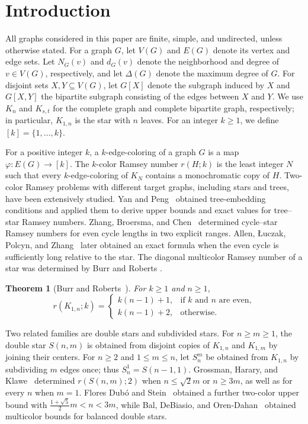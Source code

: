 \documentclass[11pt]{article}
\newtheorem{theorem}{Theorem}[section]
\theoremstyle{definition}
\theoremstyle{remark}
\begin{document}

\section{Introduction}
All graphs considered in this paper are finite, simple, and undirected,
unless otherwise stated. For a graph \(G\), let
\(V(G)\) and \(E(G)\) denote its vertex and edge sets. Let
\(N_G(v)\) and \(d_G(v)\) denote the neighborhood and degree of
\(v\in V(G)\), respectively, and let \(\Delta(G)\) denote the maximum
degree of \(G\). For disjoint sets \(X,Y\subseteq V(G)\), let
\(G[X]\) denote the subgraph induced by \(X\) and \(G[X,Y]\) the
bipartite subgraph consisting of the edges between \(X\) and \(Y\). We use \(K_n\) and \(K_{s,t}\)
for the complete graph and complete bipartite graph, respectively; in
particular, \(K_{1,n}\) is the star with \(n\) leaves. For an integer $k\ge1$, we define $[k]=\{1,\ldots,k\}$.

For a positive integer \(k\), a \(k\)-edge-coloring of a graph \(G\)
is a map \(\varphi:E(G)\to[k]\). The \(k\)-color Ramsey number
\(r(H;k)\) is the least integer \(N\) such that every
\(k\)-edge-coloring of \(K_N\) contains a monochromatic copy of \(H\). Two-color Ramsey problems with different target graphs, including stars and trees, have been extensively studied. Yan and
Peng~\cite{YanPengTreeStar} obtained tree-embedding conditions
and applied them to derive upper bounds and exact values for
tree--star Ramsey numbers. Zhang, Broersma, and
Chen~\cite{ZhangBroersmaChenCycleStar} determined cycle--star
Ramsey numbers for even cycle lengths in two explicit ranges.
Allen, {\L}uczak, Polcyn, and Zhang~\cite{AllenEtAlCycleStar}
later obtained an exact formula when the even cycle is
sufficiently long relative to the star. The diagonal multicolor Ramsey number of a star was determined
by Burr and Roberts \cite{BurrRoberts}.
\begin{theorem}[Burr and Roberts~\cite{BurrRoberts}]
\label{thm:star-ramsey}
For \(k\ge1\) and \(n\ge1\),
\[
 r(K_{1,n};k)=
 \begin{cases}
 k(n-1)+1,&\text{if \(k\) and \(n\) are even},\\
 k(n-1)+2,&\text{otherwise}.
 \end{cases}
\]
\end{theorem}

Two related families are double stars and subdivided stars. For
\(n\ge m\ge1\), the double star \(S(n,m)\) is obtained from disjoint
copies of \(K_{1,n}\) and \(K_{1,m}\) by joining their centers. For
\(n\ge2\) and \(1\le m\le n\), let \(S_n^m\) be obtained from
\(K_{1,n}\) by subdividing \(m\) edges once; thus
\(S_n^1=S(n-1,1)\). Grossman, Harary, and
Klawe~\cite{GrossmanEtAl} determined \(r(S(n,m);2)\) when
\(n\le\sqrt{2}m\) or \(n\ge3m\), as well as for every \(n\) when
\(m=1\). Flores Dub\'o and Stein~\cite{FloresStein} obtained a
further two-color upper bound with
\(\frac{1+\sqrt5}{2}m<n<3m\), while Bal, DeBiasio, and
Oren-Dahan~\cite{BalEtAl} obtained multicolor bounds for balanced
double stars.
\end{document}
